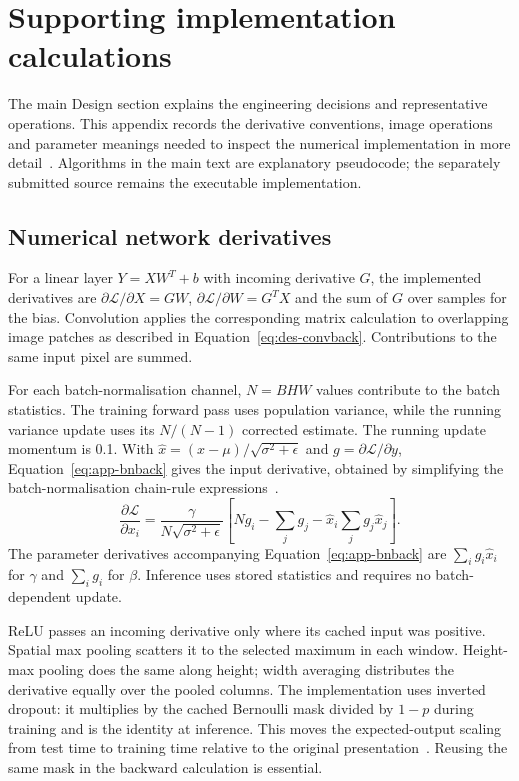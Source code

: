 \section{Supporting implementation calculations}
\label{app:des-implementation}
The main Design section explains the engineering decisions and representative operations. This appendix records the derivative conventions, image operations and parameter meanings needed to inspect the numerical implementation in more detail~\cite[\texttt{train.py}, \texttt{segment.py}, \texttt{style.py}]{braunepipeline2026}. Algorithms in the main text are explanatory pseudocode; the separately submitted source remains the executable implementation.

\subsection{Numerical network derivatives}
\label{app:des-derivatives}
For a linear layer $Y=XW^T+b$ with incoming derivative $G$, the implemented derivatives are $\partial\mathcal L/\partial X=GW$, $\partial\mathcal L/\partial W=G^TX$ and the sum of $G$ over samples for the bias. Convolution applies the corresponding matrix calculation to overlapping image patches as described in Equation~\ref{eq:des-convback}. Contributions to the same input pixel are summed.

For each batch-normalisation channel, $N=BHW$ values contribute to the batch statistics. The training forward pass uses population variance, while the running variance update uses its $N/(N-1)$ corrected estimate. The running update momentum is 0.1. With $\widehat x=(x-\mu)/\sqrt{\sigma^2+\epsilon}$ and $g=\partial\mathcal L/\partial y$, Equation~\ref{eq:app-bnback} gives the input derivative, obtained by simplifying the batch-normalisation chain-rule expressions~\cite[PDF p.~4]{ioffe2015}.
\begin{equation}
\frac{\partial\mathcal L}{\partial x_i}=
\frac{\gamma}{N\sqrt{\sigma^2+\epsilon}}
\left[Ng_i-\sum_jg_j-\widehat x_i\sum_jg_j\widehat x_j\right].
\label{eq:app-bnback}
\end{equation}
The parameter derivatives accompanying Equation~\ref{eq:app-bnback} are $\sum_i g_i\widehat x_i$ for $\gamma$ and $\sum_i g_i$ for $\beta$. Inference uses stored statistics and requires no batch-dependent update.

ReLU passes an incoming derivative only where its cached input was positive. Spatial max pooling scatters it to the selected maximum in each window. Height-max pooling does the same along height; width averaging distributes the derivative equally over the pooled columns. The implementation uses inverted dropout: it multiplies by the cached Bernoulli mask divided by $1-p$ during training and is the identity at inference. This moves the expected-output scaling from test time to training time relative to the original presentation~\cite[pp.~1931, 1934]{srivastava2014}. Reusing the same mask in the backward calculation is essential.

